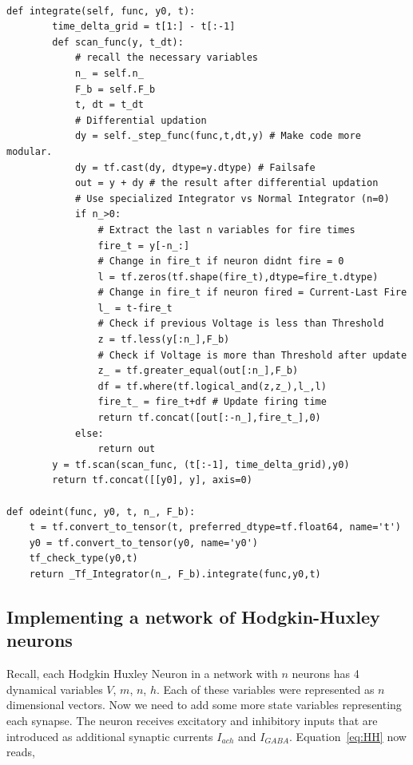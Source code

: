 \documentclass[10pt,letterpaper]{article}
\begin{document}
\begin{verbatim}

def integrate(self, func, y0, t): 
        time_delta_grid = t[1:] - t[:-1]
        def scan_func(y, t_dt): 
            # recall the necessary variables
            n_ = self.n_
            F_b = self.F_b
            t, dt = t_dt
            # Differential updation
            dy = self._step_func(func,t,dt,y) # Make code more modular.
            dy = tf.cast(dy, dtype=y.dtype) # Failsafe
            out = y + dy # the result after differential updation
            # Use specialized Integrator vs Normal Integrator (n=0)
            if n_>0:
                # Extract the last n variables for fire times
                fire_t = y[-n_:] 
                # Change in fire_t if neuron didnt fire = 0
                l = tf.zeros(tf.shape(fire_t),dtype=fire_t.dtype) 
                # Change in fire_t if neuron fired = Current-Last Fire
                l_ = t-fire_t 
                # Check if previous Voltage is less than Threshold
                z = tf.less(y[:n_],F_b)              
                # Check if Voltage is more than Threshold after update
                z_ = tf.greater_equal(out[:n_],F_b)  
                df = tf.where(tf.logical_and(z,z_),l_,l) 
                fire_t_ = fire_t+df # Update firing time 
                return tf.concat([out[:-n_],fire_t_],0)
            else:
                return out
        y = tf.scan(scan_func, (t[:-1], time_delta_grid),y0)
        return tf.concat([[y0], y], axis=0)
        
def odeint(func, y0, t, n_, F_b):
    t = tf.convert_to_tensor(t, preferred_dtype=tf.float64, name='t')
    y0 = tf.convert_to_tensor(y0, name='y0')
    tf_check_type(y0,t)
    return _Tf_Integrator(n_, F_b).integrate(func,y0,t)
\end{verbatim}

\subsection*{Implementing a network of Hodgkin-Huxley neurons}

Recall, each Hodgkin Huxley Neuron in a network with $n$ neurons has 4 dynamical variables $V$, $ m$, $n$, $h$. Each of these variables were represented as $n$\textemdash dimensional vectors. Now we need to add some more state variables representing each synapse. The neuron receives excitatory and inhibitory inputs that are introduced as additional synaptic currents $I_{ach}$ and $I_{GABA}$. Equation~\ref{eq:HH} now reads, 
\end{document}
